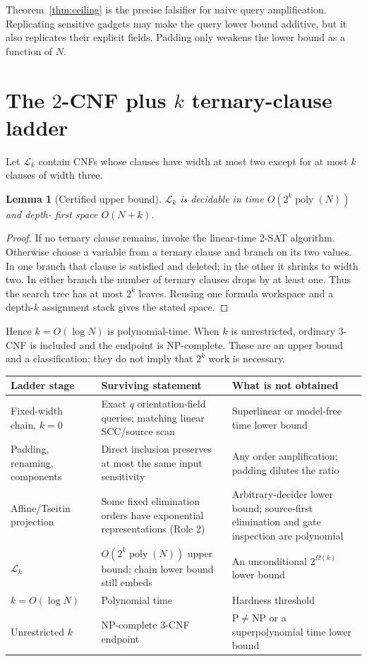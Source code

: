 \documentclass[11pt]{article}
\newtheorem{lemma}{Lemma}
\begin{document}
Theorem~\ref{thm:ceiling} is the precise falsifier for naive query
amplification.  Replicating sensitive gadgets may make the query lower bound
additive, but it also replicates their explicit fields.  Padding only weakens
the lower bound as a function of $N$.

\section*{The $2$-CNF plus $k$ ternary-clause ladder}
Let $\mathcal L_k$ contain CNFs whose clauses have width at most two except for
at most $k$ clauses of width three.

\begin{lemma}[Certified upper bound]\label{lem:upper}
$\mathcal L_k$ is decidable in time $O(2^k\operatorname{poly}(N))$ and depth-
first space $O(N+k)$.
\end{lemma}
\begin{proof}
If no ternary clause remains, invoke the linear-time 2-SAT algorithm.  Otherwise
choose a variable from a ternary clause and branch on its two values.  In one
branch that clause is satisfied and deleted; in the other it shrinks to width
two.  In either branch the number of ternary clauses drops by at least one.
Thus the search tree has at most $2^k$ leaves.  Reusing one formula workspace
and a depth-$k$ assignment stack gives the stated space.
\end{proof}

Hence $k=O(\log N)$ is polynomial-time.  When $k$ is unrestricted, ordinary
3-CNF is included and the endpoint is NP-complete.  These are an upper bound
and a classification; they do not imply that $2^k$ work is necessary.

\begin{center}
\begin{tabular}{p{.22\linewidth}p{.31\linewidth}p{.34\linewidth}}
\toprule
Ladder stage & Surviving statement & What is not obtained \\
\midrule
Fixed-width chain, $k=0$ & Exact $q$ orientation-field queries; matching
linear SCC/source scan & Superlinear or model-free time lower bound \\
Padding, renaming, components & Direct inclusion preserves at most the same
input sensitivity & Any order amplification; padding dilutes the ratio \\
Affine/Tseitin projection & Some fixed elimination orders have exponential
representations (Role 2) & Arbitrary-decider lower bound; source-first
elimination and gate inspection are polynomial \\
$\mathcal L_k$ & $O(2^k\operatorname{poly}(N))$ upper bound; chain lower bound
still embeds & An unconditional $2^{\Omega(k)}$ lower bound \\
$k=O(\log N)$ & Polynomial time & Hardness threshold \\
Unrestricted $k$ & NP-complete 3-CNF endpoint & P$\ne$NP or a superpolynomial
time lower bound \\
\bottomrule
\end{tabular}
\end{center}
\end{document}
